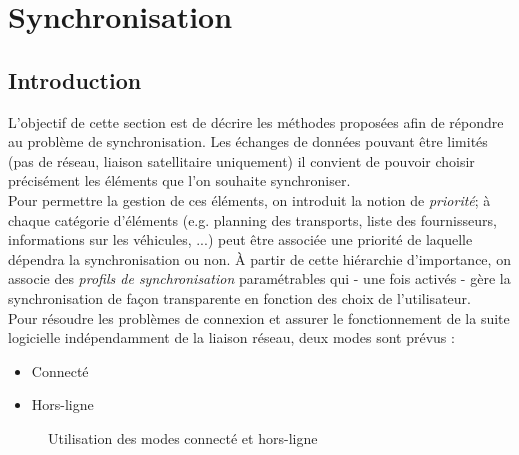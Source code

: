 \section{Synchronisation}
% 

\subsection{Introduction}
L'objectif de cette section est de décrire les méthodes proposées afin de répondre au problème de synchronisation. Les échanges de données pouvant être limités (pas de réseau, liaison satellitaire uniquement) il convient de pouvoir choisir précisément les éléments que l'on souhaite synchroniser.\\
Pour permettre la gestion de ces éléments, on introduit la notion de \emph{priorité}; à chaque catégorie d'éléments (e.g. planning des transports, liste des fournisseurs, informations sur les véhicules, ...) peut être associée une priorité de laquelle dépendra la synchronisation ou non. À partir de cette \og{}hiérarchie d'importance\fg{}, on associe des \emph{profils de synchronisation} paramétrables qui - une fois activés - gère la synchronisation de façon transparente en fonction des choix de l'utilisateur.\\
Pour résoudre les problèmes de connexion et assurer le fonctionnement de la suite logicielle indépendamment de la liaison réseau, deux modes sont prévus :
\begin{itemize}
    \item Connecté
    \item Hors-ligne
\end{itemize}
\begin{figure}[htbp]
    \centering
	\caption{Utilisation des modes connecté et hors-ligne}
	\label{explicationcodeco}
\end{figure}

